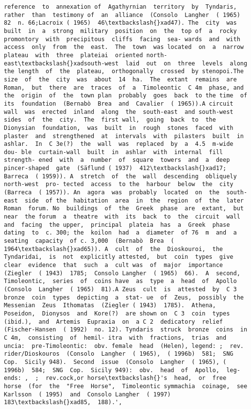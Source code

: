 \documentclass[11pt]{article}
\begin{document}
\begin{Verbatim}[commandchars=\\\{\}]
reference  to  annexation of  Agathyrnian  territory  by  Tyndaris,  rather  than  testimony of  an  alliance  (Consolo  Langher  ( 1965)  82  n. 66;Lacroix ( 1965)  46\textbackslash{}xad47). The  city  was  built  in  a  strong  military  position  on  the  top of  a  rocky  promontory  with  precipitous  cliffs  facing  sea- wards  and  with  access  only  from  the  east.  The  town  was located  on  a  narrow  plateau  with  three  plateiai  oriented north-east\textbackslash{}xadsouth-west  laid  out  on  three  levels  along  the length  of  the  plateau,  orthogonally  crossed  by stenopoi.The size  of  the  city  was  about  14  ha.  The  extant  remains  are Roman,  but  there  are  traces  of  a  Timoleontic  C 4m  phase, and  the  origin  of  the  town plan  probably  goes  back  to the time  of  its  foundation  (Bernabò  Brea  and  Cavalier  ( 1965)).A circuit  wall  was  erected  inland  along  the  south-east  and south-west  sides  of  the  city.  The  first wall,  going  back  to  the Dionysian  foundation,  was  built  in  rough  stones  faced  with plaster  and  strengthened  at  intervals  with  pilasters  built  in ashlar.  In  C 3e(?)  the  wall  was  replaced  by  a  4.5  m-wide  dou- ble  curtain-wall  built  in  ashlar  with  internal  fill strength- ened  with  a  number  of  square  towers  and  a  deep pincer-shaped  gate  (Säflund ( 1937)  412\textbackslash{}xad17;  Barreca  ( 1959)). A  stretch  of  the  wall  descending  obliquely  north-west  pro- tected  access  to the  harbour  below  the  city  (Barreca  ( 1957)). An  agora  was  probably  located  on  the  south-east  side  of the  habitation  area  in  the  region  of  the  later  Roman  forum. No  buildings  of  the  Greek  phase  are  extant,  but  near  the forum  a  theatre  with  its  back  to  the  circuit  wall  and  facing  the upper,  principal  plateia  has  a  Greek  phase  dating  to  c. 300; the  koilon  had  a  diameter  of 76  m  and  a  seating  capacity  of c. 3,000  (Bernabò  Brea  ( 1964\textbackslash{}xad65)). A  cult  of  the  Dioskouroi,  the  Tyndaridai,  is  not  explicitly attested,  but  coin  types  give  clear  evidence  that  such  a  cult was  of  major  importance  (Ziegler  ( 1943)  1785;  Consolo Langher  ( 1965)  66).  A  second,  Timoleontic,  series  of  coins have  as  type  a  head  of  Apollo  (Consolo  Langher  ( 1965)  81).A Zeus  cult  is  attested  by  C 3  bronze  coin  types  depicting  a  stat- ue  of  Zeus,  possibly  the  Messenian  Zeus  Ithomatas  (Ziegler ( 1943)  1785).  Athena,  Poseidon,  Dionysos  and  Kore(?)  are shown on  C 3  coin  types  (ibid.),  and  Artemis  Eupraxia  on  a C 2  dedicatory  relief  (Fischer-Hansen  ( 1992)  no. 12). Tyndaris  struck  bronze  coins  in  C 4m,  consisting  of  hemil- itra  with  fractions,  trias  and  uncia:  pre-Timoleontic:  obv. female  head  (Helen), legend: ;  rev. rider/Dioskouros  (Consolo  Langher  ( 1965),  ( 1996b)  581;  SNG Cop.  Sicily 948).  Second  issue  (Consolo  Langher  ( 1965), ( 1996b)  584;  SNG  Cop.  Sicily 949):  obv.  head  of  Apollo,  leg- ends: ,  ;  rev.cock,or horse\textbackslash{}'s  head,  or  free  horse  (for  the  "Free  Horse",  Timoleontic symmachia  coinage,  see  Karlsson  ( 1995)  and  Consolo Langher  ( 1997)  183\textbackslash{}xad85,  188).',

\end{Verbatim}
\end{document}
